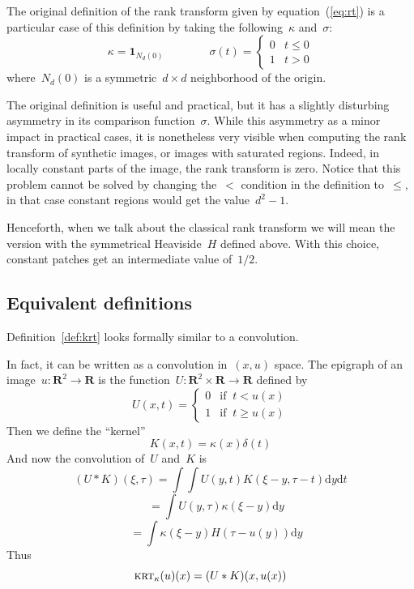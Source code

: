 \documentclass[12pt]{article}                  %
\begin{document}
The original definition of the rank transform given by
equation~(\ref{eq:rt}) is a particular case of this definition by taking
the following~$\kappa$ and~$\sigma$:
\[
	\kappa=\mathbf{1}_{N_d(0)}
	\qquad
	\qquad
	\sigma(t)=\begin{cases}0&t\le0\\1&t>0\end{cases}
\]
where~$N_d(0)$ is a symmetric~$d\times d$ neighborhood of the origin.

The original definition is useful and practical, but it has a slightly
disturbing asymmetry in its comparison function~$\sigma$.  While this
asymmetry as a minor impact in practical cases, it is nonetheless very
visible when computing the rank transform of synthetic images, or images
with saturated regions.  Indeed, in locally constant parts of the image, the
rank transform is zero.  Notice that this problem cannot be solved by
changing the~$<$ condition in the definition to~$\le$, in that case constant
regions would get the value~$d^2-1$.

Henceforth, when we talk about the classical rank transform we will mean the
version with the symmetrical Heaviside~$H$ defined above.  With this choice,
constant patches get an intermediate value of~$1/2$.



\subsection{Equivalent definitions}


Definition~\ref{def:krt} looks formally similar to a convolution.

In fact, it can be written as a convolution in~$(x,u)$ space.
The epigraph of an image~$u:\mathbf{R}^2\to\mathbf{R}$ is the
function~$U:\mathbf{R}^2\times\mathbf{R}\to\mathbf{R}$ defined by
\[
	U(x,t) = \begin{cases}
		0 & \textrm{if $\ t< u(x)$} \\
		1 & \textrm{if $\ t\ge u(x)$}
	\end{cases}
\]
Then we define the ``kernel''
\[
	K(x,t) = \kappa(x)\delta(t)
\]
And now the convolution of~$U$ and~$K$ is
\[
	(U*K)(\xi,\tau)
	=
	\int
	\int U\left(y,t\right)K\left(\xi-y,\tau-t\right)
		\mathrm{d} y
		\mathrm{d} t
\]
\[
	\quad
	=\int
	U(y,\tau)
	\kappa(\xi - y)
		\mathrm{d} y
\]
\[
	\quad
	=\int\kappa(\xi-y)H(\tau - u(y))
		\mathrm{d} y
\]
Thus
\begin{equation}\label{eq:convolution1}
	\textsc{krt}_\kappa(u)(x)=(U*K)(x,u(x))
\end{equation}
\end{document}
